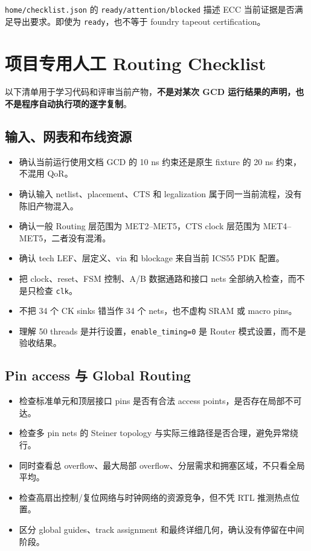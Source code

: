 \documentclass[UTF8,a4paper,11pt,fontset=fandol]{ctexart}
\newcommand{\code}[1]{\nolinkurl{#1}}
\begin{document}
\code{home/checklist.json} 的 \code{ready/attention/blocked} 描述 ECC 当前证据是否满足导出要求。即使为 \code{ready}，也不等于 foundry tapeout certification。

\section{项目专用人工 Routing Checklist}

以下清单用于学习代码和评审当前产物，\textbf{不是对某次 GCD 运行结果的声明，也不是程序自动执行项的逐字复制}。

\subsection{输入、网表和布线资源}

\begin{itemize}[leftmargin=2em]
  \item[$\square$] 确认当前运行使用文档 GCD 的 10 ns 约束还是原生 fixture 的 20 ns 约束，不混用 QoR。
  \item[$\square$] 确认输入 netlist、placement、CTS 和 legalization 属于同一当前流程，没有陈旧产物混入。
  \item[$\square$] 确认一般 Routing 层范围为 MET2--MET5，CTS clock 层范围为 MET4--MET5，二者没有混淆。
  \item[$\square$] 确认 tech LEF、层定义、via 和 blockage 来自当前 ICS55 PDK 配置。
  \item[$\square$] 把 clock、reset、FSM 控制、A/B 数据通路和接口 nets 全部纳入检查，而不是只检查 \code{clk}。
  \item[$\square$] 不把 34 个 CK sinks 错当作 34 个 nets，也不虚构 SRAM 或 macro pins。
  \item[$\square$] 理解 50 threads 是并行设置，\code{enable_timing=0} 是 Router 模式设置，而不是验收结果。
\end{itemize}

\subsection{Pin access 与 Global Routing}

\begin{itemize}[leftmargin=2em]
  \item[$\square$] 检查标准单元和顶层接口 pins 是否有合法 access points，是否存在局部不可达。
  \item[$\square$] 检查多 pin nets 的 Steiner topology 与实际三维路径是否合理，避免异常绕行。
  \item[$\square$] 同时查看总 overflow、最大局部 overflow、分层需求和拥塞区域，不只看全局平均。
  \item[$\square$] 检查高扇出控制/复位网络与时钟网络的资源竞争，但不凭 RTL 推测热点位置。
  \item[$\square$] 区分 global guides、track assignment 和最终详细几何，确认没有停留在中间阶段。
\end{itemize}
\end{document}
